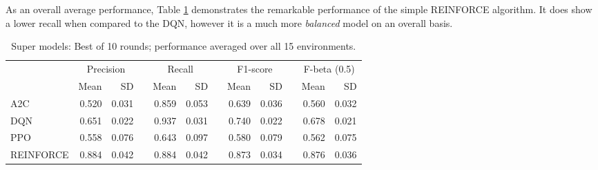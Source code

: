 \documentclass[a4paper, 12pt]{article}
\newcommand{\rowspace}[1]{\renewcommand{\arraystretch}{#1}}
\begin{document}
As an overall average performance, Table \ref{tbl:supermodelssummary} demonstrates the remarkable performance of the simple REINFORCE algorithm. It does show a lower recall when compared to the DQN, however it is a much more \textit{balanced} model on an overall basis.
\begin{table}[!htb]\centering
	\sffamily
	\rowspace{1.3}
	\begin{tabular}{@{}l rr c rr c rr c rr@{}}
		\arrayrulecolor{black!40}\toprule
		& \multicolumn{2}{c}{Precision} & \phantom{i} & \multicolumn{2}{c}{Recall} & \phantom{i} & \multicolumn{2}{c}{F1-score} & \phantom{i} & \multicolumn{2}{c}{F-beta (0.5)} \\
		\cmidrule{2-3} \cmidrule{5-6} \cmidrule{8-9} \cmidrule{11-12} 
		
		&Mean &SD & &Mean &SD & &Mean &SD& &Mean & SD\\ \midrule
		A2C & 0.520 & 0.031 & &0.859 & 0.053 & & 0.639 & 0.036 & &0.560 &0.032 \\
		DQN & 0.651 & 0.022 & &0.937 & 0.031 & & 0.740 & 0.022 & &0.678 &0.021 \\
		PPO & 0.558 & 0.076 & &0.643 & 0.097 & & 0.580 & 0.079 & &0.562 &0.075 \\
		REINFORCE & 0.884 & 0.042 & &0.884 & 0.042 & & 0.873 & 0.034 & &0.876 &0.036 \\
		\bottomrule
	\end{tabular}
	\caption{Super models: Best of 10 rounds; performance averaged over all 15 environments.}
	\label{tbl:supermodelssummary}
\end{table}
\end{document}
